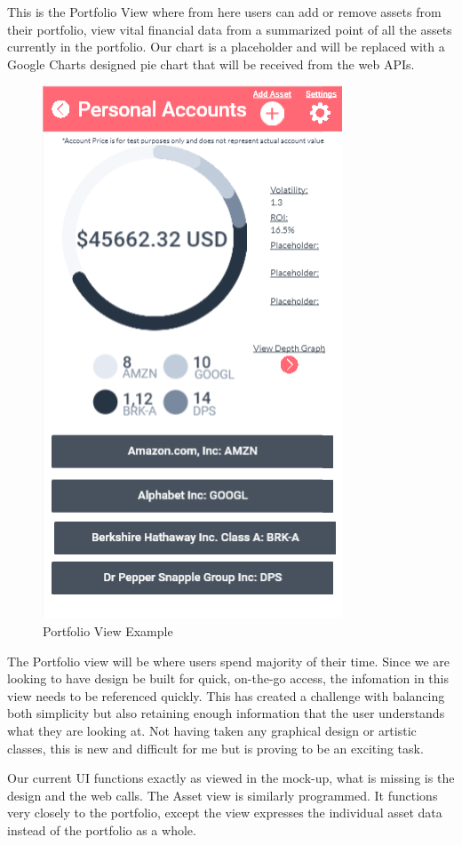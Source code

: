 \documentclass[letterpaper,10pt,titlepage,journal,compsoc,draftclsnofoot,onecolumn]{IEEEtran}
\begin{document}
This is the Portfolio View where from here users can add or remove assets from their portfolio, view vital financial data from a summarized point of all the assets currently in the portfolio. Our chart is a placeholder and will be replaced with a Google Charts designed pie chart that will be received from the web APIs.  
\begin{figure}[h]
   \caption{Portfolio View Example}
   \includegraphics[scale=.5]{portfolio_screenshot}
\end{figure}
The Portfolio view will be where users spend majority of their time. Since we are looking to have design be built for quick, on-the-go access, the infomation in this view needs to be referenced quickly. This has created a challenge with balancing both simplicity but also retaining enough information that the user understands what they are looking at. Not having taken any graphical design or artistic classes, this is new and difficult for me but is proving to be an exciting task.

Our current UI functions exactly as viewed in the mock-up, what is missing is the design and the web calls. The Asset view is similarly programmed. It functions very closely to the portfolio, except the view expresses the individual asset data instead of the portfolio as a whole.
\end{document}
